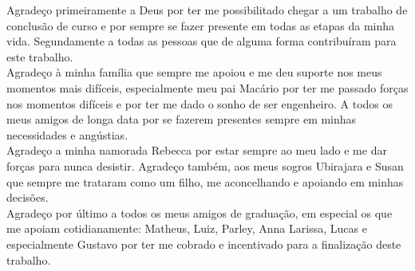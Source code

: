 \begin{agradecimentos}
    Agradeço primeiramente a Deus por ter me possibilitado chegar a um trabalho de conclusão de curso e por sempre se fazer presente em todas as etapas da minha vida. Segundamente a todas as pessoas que de alguma forma contribuíram para este trabalho. \\
    Agradeço à minha família que sempre me apoiou e me deu suporte nos meus momentos mais difíceis, especialmente meu pai Macário por ter me passado forças nos momentos difíceis e por ter me dado o sonho de ser engenheiro. A todos os meus amigos de longa data por se fazerem presentes sempre em minhas necessidades e angústias. \\
    Agradeço a minha namorada Rebecca por estar sempre ao meu lado e me dar forças para nunca desistir. Agradeço também, aos meus sogros Ubirajara e Susan que sempre me trataram como um filho, me aconcelhando e apoiando em minhas decisões. \\
    Agradeço por último a todos os meus amigos de graduação, em especial os que me apoiam cotidianamente: Matheus, Luiz, Parley, Anna Larissa, Lucas e especialmente Gustavo por ter me cobrado e incentivado para a finalização deste trabalho.
\end{agradecimentos}
